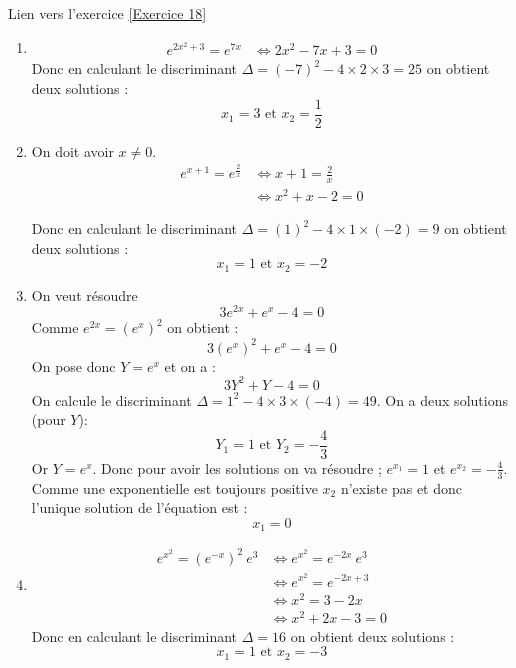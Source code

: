 \documentclass[12pt,fleqn]{report} %
\begin{document}
\begin{correction}Lien vers l'exercice   \ref{Exercice 18}
	\begin{enumerate}
		\item 
		
		\begin{align*}
		e^{2x^2+3} =e^{7x} & \iff 2x^2-7x+3  =0
		\end{align*}
		Donc en calculant le discriminant $\Delta = (-7)^2 - 4\times2\times 3 = 25$ on obtient deux solutions :
		\[
		x_1 = 3 \text{ et } x_2 = \frac{1}{2}
		\]
		\item On doit avoir $x\neq 0$.
		\begin{align*}
		e^{x+1} =e^{\frac{2}{x}} & \iff x+1 =\frac{2}{x}\\
		& \iff x^2+x-2 =0
		\end{align*}
		
		Donc en calculant le discriminant $\Delta = (1)^2 - 4\times1\times (-2) = 9$ on obtient deux solutions :
		\[
		x_1 = 1 \text{ et } x_2 = -2
		\]
		
		\item On veut résoudre \[
		3 e^{2x} + e^x - 4 = 0
		\]
		Comme $e^{2x} = \left(e^{x}\right)^2$ on obtient : 
		\[
		3 \left(e^{x}\right)^2 + e^x - 4 = 0
		\]
		On pose donc $Y = e^x$ et on a : 
		\[
		3Y^2 + Y - 4 = 0
		\]
		On calcule le discriminant $\Delta = 1^2 - 4\times 3 \times (-4) = 49$.
		On a deux solutions (pour $Y$):
		\[
		Y_1 = 1 \text{ et } Y_2 = -\frac{4}{3}
		\]
		Or $Y = e^x$. Donc pour avoir les solutions on va résoudre ; $e^{x_1} = 1$ et $e^{x_2} = -\frac{4}{3}$.\\
		Comme une exponentielle est toujours positive $x_2$ n'existe pas et donc l'unique solution de l'équation est :\[
		x_1 = 0
		\]
		
		
		\item 
		\begin{align*}
		e^{x^2} =(e^{-x})^2 \ e^3 & \iff e^{x^2} = e^{-2x} \ e^3 \\ 
		& \iff e^{x^2} = e^{- 2x + 3} \\ 
		& \iff x^2 =3-2x \\
		& \iff x^2 + 2x - 3 = 0
		\end{align*}
		Donc en calculant le discriminant $\Delta = 16$ on obtient deux solutions :
		\[
		x_1 = 1 \text{ et } x_2 = -3
		\]
		

\end{enumerate}
\end{correction}
\end{document}
